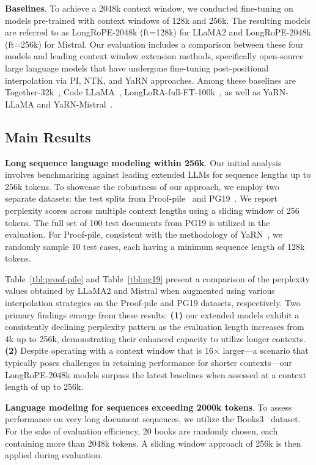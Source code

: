 \textbf{Baselines}. To achieve a 2048k context window, we conducted fine-tuning on models pre-trained with context windows of 128k and 256k. The resulting models are referred to as LongRoPE-2048k (ft=128k) for LLaMA2 and LongRoPE-2048k (ft=256k) for Mistral. Our evaluation includes a comparison between these four models and leading context window extension methods, specifically open-source large language models that have undergone fine-tuning post-positional interpolation via PI, NTK, and YaRN approaches. Among these baselines are Together-32k~\cite{together}, Code LLaMA~\cite{codellama}, LongLoRA-full-FT-100k~\cite{longlora}, as well as YaRN-LLaMA and YaRN-Mistral~\cite{yarn}.

\subsection{Main Results}

\label{sec:mainresult}
\textbf{Long sequence language modeling within 256k}. Our initial analysis involves benchmarking against leading extended LLMs for sequence lengths up to 256k tokens. To showcase the robustness of our approach, we employ two separate datasets: the test splits from Proof-pile~\cite{pg19} and PG19~\cite{pile}. We report perplexity scores across multiple context lengths using a sliding window of 256 tokens. The full set of 100 test documents from PG19 is utilized in the evaluation. For Proof-pile, consistent with the methodology of YaRN~\cite{yarn}, we randomly sample 10 test cases, each having a minimum sequence length of 128k tokens.

Table~\ref{tbl:proof-pile} and Table~\ref{tbl:pg19} present a comparison of the perplexity values obtained by LLaMA2 and Mistral when augmented using various interpolation strategies on the Proof-pile and PG19 datasets, respectively. Two primary findings emerge from these results: \textbf{(1)} our extended models exhibit a consistently declining perplexity pattern as the evaluation length increases from 4k up to 256k, demonstrating their enhanced capacity to utilize longer contexts. \textbf{(2)} Despite operating with a context window that is 16$\times$ larger—a scenario that typically poses challenges in retaining performance for shorter contexts—our LongRoPE-2048k models surpass the latest baselines when assessed at a context length of up to 256k.

\textbf{Language modeling for sequences exceeding 2000k tokens}. To assess performance on very long document sequences, we utilize the Books3~\cite{pile} dataset. For the sake of evaluation efficiency, 20 books are randomly chosen, each containing more than 2048k tokens. A sliding window approach of 256k is then applied during evaluation.

